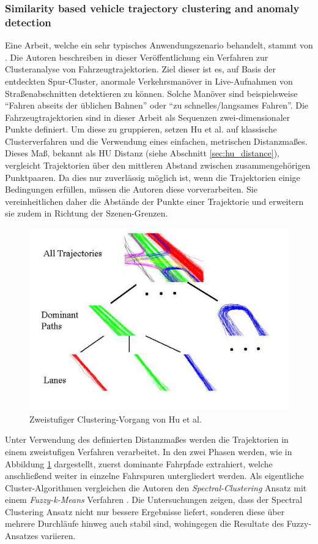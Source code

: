 \subsubsection*{Similarity based vehicle trajectory clustering and anomaly detection}
Eine Arbeit, welche ein sehr typisches Anwendungszenario behandelt, stammt von \cite[]{Hu2005}. Die Autoren
beschreiben in dieser Veröffentlichung ein Verfahren zur Clusteranalyse von Fahrzeugtrajektorien. Ziel dieser
ist es, auf Basis der entdeckten Spur-Cluster, anormale Verkehrsmanöver in Live-Aufnahmen von Straßenabschnitten
detektieren zu können. Solche Manöver sind beispielsweise ``Fahren abseits der üblichen Bahnen'' oder
``zu schnelles/langsames Fahren''.
Die Fahrzeugtrajektorien sind in dieser Arbeit als Sequenzen zwei-dimensionaler Punkte definiert.
Um diese zu gruppieren, setzen Hu et al. auf klassische Clusterverfahren und die Verwendung eines
einfachen, metrischen Distanzmaßes. Dieses Maß, bekannt als HU Distanz (siehe Abschnitt \ref{sec:hu_distance}),
vergleicht Trajektorien über den mittleren Abstand zwischen zusammengehörigen Punktpaaren.
Da dies nur zuverlässig möglich ist, wenn die Trajektorien einige Bedingungen erfüllen, müssen die
Autoren diese vorverarbeiten. Sie vereinheitlichen daher die Abstände der Punkte einer Trajektorie und erweitern
sie zudem in Richtung der Szenen-Grenzen.

\begin{figure}[H]
    \centering
    \includegraphics[width=0.5\linewidth]{../resources/img/RelatedWork/Fu_HierarchicalClustering}
    \caption[Zweistufiger Clustering-Vorgang von Hu et al.]{Zweistufiger Clustering-Vorgang von Hu et al. \cite[]{Hu2005}}
    \label{fig:relw_hu_two_step_cluster}
\end{figure}

Unter Verwendung des definierten Distanzmaßes werden die Trajektorien in einem zweistufigen Verfahren verarbeitet.
In den zwei Phasen werden, wie in Abbildung \ref{fig:relw_hu_two_step_cluster} dargestellt, zuerst dominante
Fahrpfade extrahiert, welche anschließend weiter in einzelne Fahrspuren untergliedert werden.
Als eigentliche Cluster-Algorithmen vergleichen die Autoren den \textit{Spectral-Clustering} Ansatz \cite[]{Ng2002}
mit einem \textit{Fuzzy-k-Means} Verfahren \cite[]{xie1991validity}.
Die Untersuchungen zeigen, dass der Spectral Clustering Ansatz nicht nur bessere Ergebnisse liefert, sonderen diese
über mehrere Durchläufe hinweg auch stabil sind, wohingegen die Resultate des Fuzzy-Ansatzes variieren.


